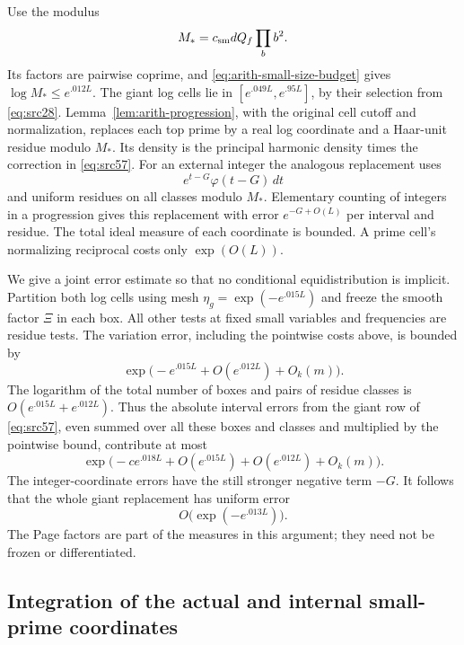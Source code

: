Use the modulus
\begin{equation}\label{eq:arith-giant-modulus}
                         M_*=c_{\rm sm}dQ_f\prod_b b^2.
\end{equation}
Its factors are pairwise coprime, and
\eqref{eq:arith-small-size-budget} gives $\log M_*\leq e^{.012L}$.
The giant log cells lie in $[e^{.049L},e^{.95L}]$, by their selection from
\eqref{eq:src28}. Lemma~\ref{lem:arith-progression}, with the original
cell cutoff and normalization, replaces each top prime by a real log
coordinate and a Haar-unit residue modulo $M_*$. Its density is the
principal harmonic density times the correction in \eqref{eq:src57}.
For an external integer the analogous replacement uses
\begin{equation}\label{eq:arith-external-density}
                         e^{t-G}\varphi(t-G)\,dt
\end{equation}
and uniform residues on all classes modulo $M_*$. Elementary counting of
integers in a progression gives this replacement with error
$e^{-G+O(L)}$ per interval and residue. The total ideal measure of each
coordinate is bounded. A prime cell's normalizing reciprocal costs only
$\exp(O(L))$.

We give a joint error estimate so that no conditional equidistribution is
implicit. Partition both log cells using mesh
$\eta_g=\exp(-e^{.015L})$ and freeze the smooth factor $\Xi$ in each box.
All other tests at fixed small variables and frequencies are residue tests.
The variation error, including the pointwise costs above, is bounded by
\[
 \exp\bigl(-e^{.015L}+O(e^{.012L})+O_k(m)\bigr).
\]
The logarithm of the total number of boxes and pairs of residue classes is
$O(e^{.015L}+e^{.012L})$. Thus the absolute interval errors from the giant
row of \eqref{eq:src57}, even summed over all these boxes and classes and
multiplied by the pointwise bound, contribute at most
\[
 \exp\bigl(-c e^{.018L}+O(e^{.015L})+O(e^{.012L})+O_k(m)\bigr).
\]
The integer-coordinate errors have the still stronger negative term $-G$.
It follows that the whole giant replacement has uniform error
\begin{equation}\label{eq:arith-giant-error}
                         O\bigl(\exp(-e^{.013L})\bigr).
\end{equation}
The Page factors are part of the measures in this argument; they need not
be frozen or differentiated.

\subsection{Integration of the actual and internal small-prime coordinates}

